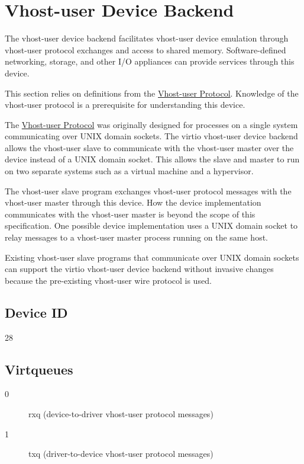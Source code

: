 \section{Vhost-user Device Backend}\label{sec:Device Types / Vhost-user Device Backend}

The vhost-user device backend facilitates vhost-user device emulation through
vhost-user protocol exchanges and access to shared memory.  Software-defined
networking, storage, and other I/O appliances can provide services through this
device.

This section relies on definitions from the \hyperref[intro:Vhost-user
Protocol]{Vhost-user Protocol}.  Knowledge of the vhost-user protocol is a
prerequisite for understanding this device.

The \hyperref[intro:Vhost-user Protocol]{Vhost-user Protocol} was originally
designed for processes on a single system communicating over UNIX domain
sockets.  The virtio vhost-user device backend allows the vhost-user slave to
communicate with the vhost-user master over the device instead of a UNIX domain
socket.  This allows the slave and master to run on two separate systems such
as a virtual machine and a hypervisor.

The vhost-user slave program exchanges vhost-user protocol messages with the
vhost-user master through this device.  How the device implementation
communicates with the vhost-user master is beyond the scope of this
specification.  One possible device implementation uses a UNIX domain socket to
relay messages to a vhost-user master process running on the same host.

Existing vhost-user slave programs that communicate over UNIX domain sockets
can support the virtio vhost-user device backend without invasive changes
because the pre-existing vhost-user wire protocol is used.

\subsection{Device ID}\label{sec:Device Types / Vhost-user Device Backend / Device ID}
  28

\subsection{Virtqueues}\label{sec:Device Types / Vhost-user Device Backend / Virtqueues}

\begin{description}
\item[0] rxq (device-to-driver vhost-user protocol messages)
\item[1] txq (driver-to-device vhost-user protocol messages)
\end{description}

